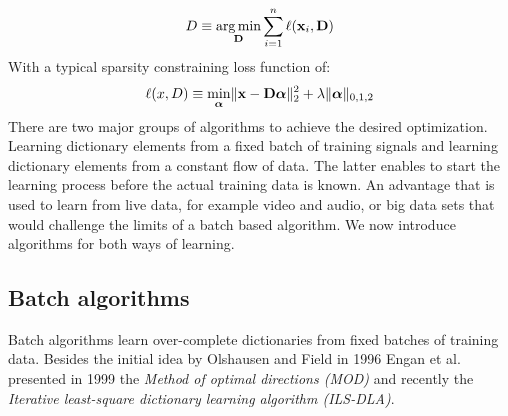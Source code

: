 \begin{equation*}
D \equiv \operatorname*{arg\,min}_{\boldsymbol{\mathrm{D}}} \sum_{i=1}^n \ell(\boldsymbol{\mathrm{x}}_i,\boldsymbol{\mathrm{D}})\label{eq:learn}
\end{equation*}
With a typical sparsity constraining loss function of:
\begin{equation*}
\ell(x,D) \equiv \min_{\boldsymbol{\mathrm{\alpha}}} \lVert \boldsymbol{\mathrm{x}} - \boldsymbol{\mathrm{D}}\boldsymbol{\mathrm{\alpha}}
\rVert^{2}_{2}  +  \lambda \lVert
\boldsymbol{\mathrm{\alpha}}
\rVert_{0,1,2} 
\end{equation*}
There are two major groups of algorithms to achieve the desired optimization.
Learning dictionary elements from a fixed batch of training
signals and learning dictionary elements from a constant flow of data. The
latter enables to start the learning process before the actual training data is
known. An advantage that is used to learn from live data, for example video and
audio, or big data sets that would challenge the limits of a batch based
algorithm. We now introduce algorithms for both ways of learning.

\subsection{Batch algorithms}
Batch algorithms learn over-complete dictionaries from fixed batches of
training data. Besides the initial idea by Olshausen and Field in
1996\cite{Olshausen1996} Engan et al.\cite{Engan1999a} presented 
in 1999 the \emph{Method of optimal directions (MOD)} and recently the
\emph{Iterative least-square dictionary learning algorithm
(ILS-DLA)}\cite{Engan2007}. 


